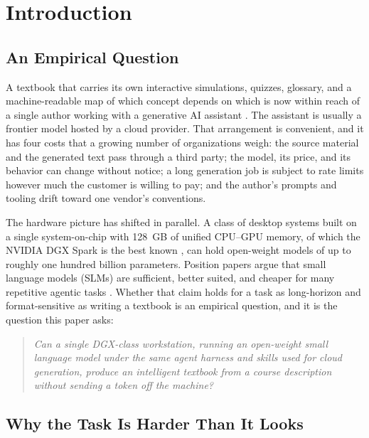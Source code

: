 \section{Introduction}
\label{sec:intro}

\subsection{An Empirical Question}

A textbook that carries its own interactive simulations, quizzes, glossary, and a machine-readable map of which concept depends on which is now within reach of a single author working with a generative AI assistant \cite{brusilovsky2022return, mccreary2025microsims}. The assistant is usually a frontier model hosted by a cloud provider. That arrangement is convenient, and it has four costs that a growing number of organizations weigh: the source material and the generated text pass through a third party; the model, its price, and its behavior can change without notice; a long generation job is subject to rate limits however much the customer is willing to pay; and the author's prompts and tooling drift toward one vendor's conventions.

The hardware picture has shifted in parallel. A class of desktop systems built on a single system-on-chip with 128~GB of unified CPU--GPU memory, of which the NVIDIA DGX Spark is the best known \cite{nvidia2025dgxspark}, can hold open-weight models of up to roughly one hundred billion parameters. Position papers argue that small language models (SLMs) are sufficient, better suited, and cheaper for many repetitive agentic tasks \cite{belcak2025slm}. Whether that claim holds for a task as long-horizon and format-sensitive as writing a textbook is an empirical question, and it is the question this paper asks:

\begin{quote}
\textit{Can a single DGX-class workstation, running an open-weight small language model under the same agent harness and skills used for cloud generation, produce an intelligent textbook from a course description without sending a token off the machine?}
\end{quote}

\subsection{Why the Task Is Harder Than It Looks}

